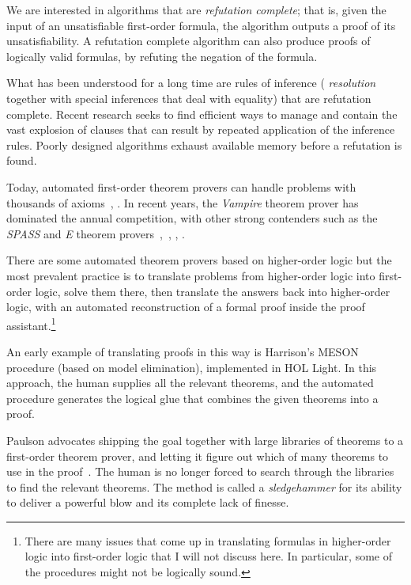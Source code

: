 \documentclass[brochure,english,12pt]{bourbaki}
\theoremstyle{plain}
\begin{document}
We are interested in algorithms that are {\it refutation complete};
that is, given the input of an unsatisfiable first-order formula, the
algorithm outputs a proof of its unsatisfiability.  A refutation
complete algorithm can also produce proofs of logically valid
formulas, by refuting the negation of the formula.

What has been understood for a long time are rules of inference ({\it
  resolution} together with special inferences that deal with
equality) that are refutation complete.  Recent research seeks to find
efficient ways to manage and contain the vast explosion of clauses
that can result by repeated application of the inference rules.
Poorly designed algorithms exhaust available memory before a
refutation is found.

Today, automated first-order theorem provers can handle problems with
thousands of axioms~\cite{bachmair2001resolution}, \cite{Ha09}.  In
recent years, the {\it Vampire} theorem prover has dominated the
annual competition, with other strong contenders such as the {\it
  SPASS} and {\it E} theorem
provers~\cite{kovacs2013first},~\cite{riazanov2002design},
\cite{WeidenbachDFKSW09}, \cite{Sch02-AICOMM}.



There are some automated theorem provers based on higher-order
logic %
but the most prevalent practice is to translate problems from
higher-order logic into first-order logic, solve them there, then
translate the answers back into higher-order logic, with an automated
reconstruction of a formal proof inside the proof
assistant.\footnote{There are many issues that come up in translating
  formulas in higher-order logic into first-order logic that I will
  not discuss here.  In particular, some of the procedures might not
  be logically sound.}

An early example of translating proofs in this way is Harrison's MESON
procedure (based on model elimination), implemented in HOL Light.  In
this approach, the human supplies all the relevant theorems, and the
automated procedure generates the logical glue that combines the given
theorems into a proof.

Paulson advocates shipping the goal together with large libraries of
theorems to a first-order theorem prover, and letting it figure out which
of many theorems to use in the proof~\cite{Paar}.  The human is no longer
forced to search through the libraries to find the relevant theorems.
The method is called a {\it sledgehammer} for its ability to deliver a
powerful blow and its complete lack of finesse.
\end{document}

